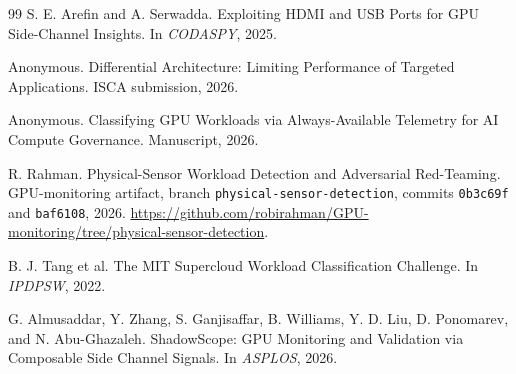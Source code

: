 \documentclass[sigplan,anonymous,review,nonacm]{acmart}
\begin{document}
\begin{thebibliography}{99}
S. E. Arefin and A. Serwadda. Exploiting HDMI and USB Ports for GPU Side-Channel Insights. In \emph{CODASPY}, 2025.

Anonymous. Differential Architecture: Limiting Performance of Targeted Applications. ISCA submission, 2026.

Anonymous. Classifying GPU Workloads via Always-Available Telemetry for AI Compute Governance. Manuscript, 2026.

R. Rahman. Physical-Sensor Workload Detection and Adversarial Red-Teaming. GPU-monitoring artifact, branch \texttt{physical-sensor-detection}, commits \texttt{0b3c69f} and \texttt{baf6108}, 2026. \url{https://github.com/robirahman/GPU-monitoring/tree/physical-sensor-detection}.

B. J. Tang et al. The MIT Supercloud Workload Classification Challenge. In \emph{IPDPSW}, 2022.

G. Almusaddar, Y. Zhang, S. Ganjisaffar, B. Williams, Y. D. Liu, D. Ponomarev, and N. Abu-Ghazaleh. ShadowScope: GPU Monitoring and Validation via Composable Side Channel Signals. In \emph{ASPLOS}, 2026.

\end{thebibliography}
\end{document}
